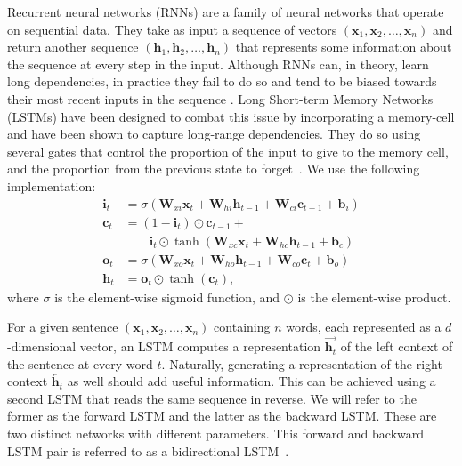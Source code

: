 \documentclass[11pt,letterpaper]{article}
\begin{document}
Recurrent neural networks (RNNs) are a family of neural networks that operate on sequential data. They take as input a sequence of vectors $(\mathbf{x}_1, \mathbf{x}_2, \ldots, \mathbf{x}_n)$ and return another sequence $(\mathbf{h}_1, \mathbf{h}_2, \ldots, \mathbf{h}_n)$ that represents some information about the sequence at every step in the input. Although RNNs can, in theory, learn long dependencies, in practice they fail to do so and tend to be biased towards their most recent inputs in the sequence \cite{bengio1994learning}. Long Short-term Memory Networks (LSTMs) have been designed to combat this issue by incorporating a memory-cell and have been shown to capture long-range dependencies. They do so using several gates that control the proportion of the input to give to the memory cell, and the proportion from the previous state to forget~\cite{hochreiter:1997}.
We use the following implementation:
\\
\begin{align*}
\mathbf{i}_{t} &= \sigma(\mathbf{W}_{xi}\mathbf{x}_{t} + \mathbf{W}_{hi}\mathbf{h}_{t-1} + \mathbf{W}_{ci}\mathbf{c}_{t-1} + \mathbf{b}_{i})\\
\mathbf{c}_{t} &= (1 - \mathbf{i}_{t})\odot\mathbf{c}_{t-1} +\\
&\qquad \mathbf{i}_{t}\odot \tanh(\mathbf{W}_{xc}\mathbf{x}_{t} + \mathbf{W}_{hc}\mathbf{h}_{t-1} + \mathbf{b}_{c})\\
\mathbf{o}_{t} &= \sigma(\mathbf{W}_{xo}\mathbf{x}_{t} + \mathbf{W}_{ho}\mathbf{h}_{t-1} + \mathbf{W}_{co}\mathbf{c}_{t} + \mathbf{b}_{o})\\
\mathbf{h}_{t} &= \mathbf{o}_{t}\odot\tanh(\mathbf{c}_{t}),
\end{align*}
where $\sigma$ is the element-wise sigmoid function, and $\odot$ is the element-wise product.

For a given sentence $(\mathbf{x}_1, \mathbf{x}_2, \ldots, \mathbf{x}_n)$ containing $n$ words, each represented as a $d$-dimensional vector, an LSTM computes a representation $\overrightarrow{\mathbf{h}_t}$ of the left context of the sentence at every word $t$. Naturally, generating a representation of the right context $\overleftarrow{\mathbf{h}_t}$ as well should add useful information. This can be achieved using a second LSTM that reads the same sequence in reverse. We will refer to the former as the forward LSTM and the latter as the backward LSTM. These are two distinct networks with different parameters. This forward and backward LSTM pair is referred to as a bidirectional LSTM~\cite{graves:2005}.
\end{document}
